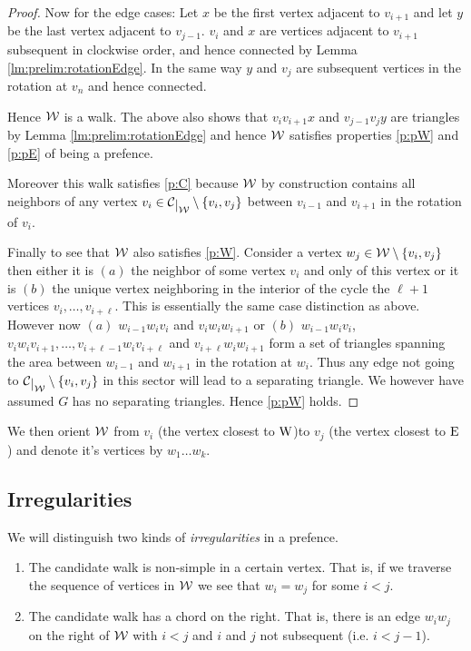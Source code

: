 \begin{proof}
  Now for the edge cases: Let $x$ be the first vertex adjacent to $v_{i+1}$ and let $y$ be the last vertex adjacent to $v_{j-1}$. $v_i$ and $x$ are vertices adjacent to $v_{i+1}$ subsequent in clockwise order, and hence connected by Lemma \ref{lm:prelim:rotationEdge}. In the same way $y$ and $v_j$ are subsequent vertices in the rotation at $v_n$ and hence connected.

  Hence $\mathcal{W}$ is a walk. The above also shows that $v_i v_{i+1} x$ and $v_{j-1} v_j y$ are triangles by Lemma \ref{lm:prelim:rotationEdge} and hence $\mathcal{W}$ satisfies properties \ref{p:pW} and \ref{p:pE} of being a prefence.

  Moreover this walk satisfies  \ref{p:C} because $\mathcal{W}$ by construction contains all neighbors of any vertex $v_i \in \restC{\W} \sm{v_i, v_j}$ between $v_{i-1}$ and $v_{i+1}$ in the rotation of $v_i$.

  Finally to see that $\mathcal{W}$ also satisfies \ref{p:W}. Consider a vertex $w_j \in \mathcal{W} \setminus \left\lbrace {v_i, v_j} \right\rbrace$ then either it is $(a)$ the neighbor of some vertex $v_i$ and only of this vertex or it is $(b)$ the unique vertex neighboring in the interior of the cycle the $\ell +1$ vertices $v_i, \ldots, v_{i+\ell}$. This is essentially the same case distinction as above. However now $(a)$ $w_{i-1} w_i v_i$ and $v_i w_i w_{i+1}$ or $(b)$ $w_{i-1} w_i v_i$, $v_i w_i v_{i+1}, \ldots, v_{i+\ell -1} w_i v_{i+\ell} $
  and $v_{i+\ell} w_i w_{i+1}$ form a set of triangles spanning the area between $w_{i-1}$ and $w_{i+1}$ in the rotation at $w_i$. Thus any edge not going to $\restC{\W} \sm{v_i, v_j}$ in this sector will lead to a separating triangle. We however have assumed $G$ has no separating triangles. Hence \ref{p:pW} holds.
  \end{proof}

  We then orient $\mathcal{W}$ from $v_i$ (the vertex closest to $\mathrm{W}$)to $v_j$ (the vertex closest to $\mathrm{E}$) and denote it's vertices by $w_1 \ldots w_k$.

\subsection{Irregularities}
  We will distinguish two kinds of \emph{irregularities} in a prefence.
  \begin{enumerate}
    \item The candidate walk is non-simple in a certain vertex. That is, if we traverse the sequence of vertices in $\mathcal{W}$ we see that $w_i = w_j$ for some $i<j$.
    \item The candidate walk has a chord on the right. That is, there is an edge $w_i w_j$ on the right of $\mathcal{W}$ with $i<j$ and $i$ and $j$ not subsequent (i.e. $i < j-1$).
  \end{enumerate}

